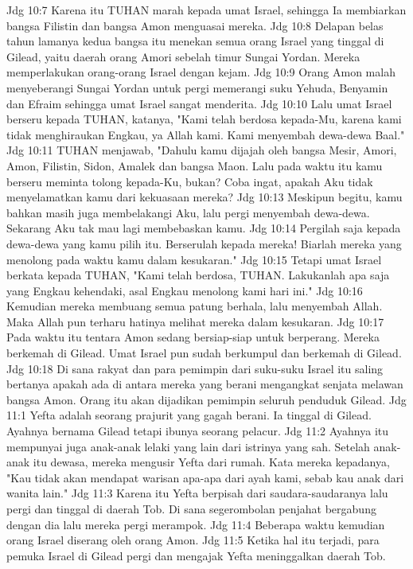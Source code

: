 Jdg 10:7  Karena itu TUHAN marah kepada umat Israel, sehingga Ia membiarkan bangsa Filistin dan bangsa Amon menguasai mereka.
Jdg 10:8  Delapan belas tahun lamanya kedua bangsa itu menekan semua orang Israel yang tinggal di Gilead, yaitu daerah orang Amori sebelah timur Sungai Yordan. Mereka memperlakukan orang-orang Israel dengan kejam.
Jdg 10:9  Orang Amon malah menyeberangi Sungai Yordan untuk pergi memerangi suku Yehuda, Benyamin dan Efraim sehingga umat Israel sangat menderita.
Jdg 10:10  Lalu umat Israel berseru kepada TUHAN, katanya, "Kami telah berdosa kepada-Mu, karena kami tidak menghiraukan Engkau, ya Allah kami. Kami menyembah dewa-dewa Baal."
Jdg 10:11  TUHAN menjawab, "Dahulu kamu dijajah oleh bangsa Mesir, Amori, Amon, Filistin, Sidon, Amalek dan bangsa Maon. Lalu pada waktu itu kamu berseru meminta tolong kepada-Ku, bukan? Coba ingat, apakah Aku tidak menyelamatkan kamu dari kekuasaan mereka?
Jdg 10:13  Meskipun begitu, kamu bahkan masih juga membelakangi Aku, lalu pergi menyembah dewa-dewa. Sekarang Aku tak mau lagi membebaskan kamu.
Jdg 10:14  Pergilah saja kepada dewa-dewa yang kamu pilih itu. Berserulah kepada mereka! Biarlah mereka yang menolong pada waktu kamu dalam kesukaran."
Jdg 10:15  Tetapi umat Israel berkata kepada TUHAN, "Kami telah berdosa, TUHAN. Lakukanlah apa saja yang Engkau kehendaki, asal Engkau menolong kami hari ini."
Jdg 10:16  Kemudian mereka membuang semua patung berhala, lalu menyembah Allah. Maka Allah pun terharu hatinya melihat mereka dalam kesukaran.
Jdg 10:17  Pada waktu itu tentara Amon sedang bersiap-siap untuk berperang. Mereka berkemah di Gilead. Umat Israel pun sudah berkumpul dan berkemah di Gilead.
Jdg 10:18  Di sana rakyat dan para pemimpin dari suku-suku Israel itu saling bertanya apakah ada di antara mereka yang berani mengangkat senjata melawan bangsa Amon. Orang itu akan dijadikan pemimpin seluruh penduduk Gilead.
Jdg 11:1  Yefta adalah seorang prajurit yang gagah berani. Ia tinggal di Gilead. Ayahnya bernama Gilead tetapi ibunya seorang pelacur.
Jdg 11:2  Ayahnya itu mempunyai juga anak-anak lelaki yang lain dari istrinya yang sah. Setelah anak-anak itu dewasa, mereka mengusir Yefta dari rumah. Kata mereka kepadanya, "Kau tidak akan mendapat warisan apa-apa dari ayah kami, sebab kau anak dari wanita lain."
Jdg 11:3  Karena itu Yefta berpisah dari saudara-saudaranya lalu pergi dan tinggal di daerah Tob. Di sana segerombolan penjahat bergabung dengan dia lalu mereka pergi merampok.
Jdg 11:4  Beberapa waktu kemudian orang Israel diserang oleh orang Amon.
Jdg 11:5  Ketika hal itu terjadi, para pemuka Israel di Gilead pergi dan mengajak Yefta meninggalkan daerah Tob.
